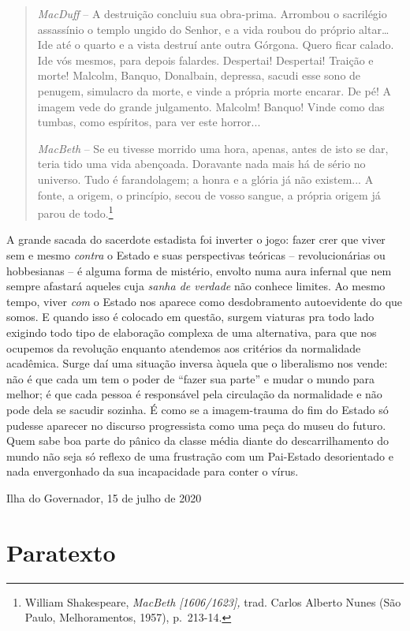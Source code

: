 \begin{quote}
\emph{MacDuff} -- A destruição concluiu sua obra-prima. Arrombou o
sacrilégio assassínio o templo ungido do Senhor, e a vida roubou do
próprio altar\ldots{} Ide até o quarto e a vista destruí ante outra
Górgona. Quero ficar calado. Ide vós mesmos, para depois falardes.
Despertai! Despertai! Traição e morte! Malcolm, Banquo, Donalbain,
depressa, sacudi esse sono de penugem, simulacro da morte, e vinde a
própria morte encarar. De pé! A imagem vede do grande julgamento.
Malcolm! Banquo! Vinde como das tumbas, como espíritos, para ver este
horror...~

\emph{MacBeth} -- Se eu tivesse morrido uma hora, apenas, antes de isto
se dar, teria tido uma vida abençoada. Doravante nada mais há de sério
no universo. Tudo é farandolagem; a honra e a glória já não existem... A
fonte, a origem, o princípio, secou de vosso sangue, a própria origem já
parou de todo.\footnote{William Shakespeare, \emph{MacBeth
  {[}1606/1623{]},} trad. Carlos Alberto Nunes (São Paulo,
  Melhoramentos, 1957), p.~213-14.}
\end{quote}

A grande sacada do sacerdote estadista foi inverter o jogo: fazer crer
que viver sem e mesmo \emph{contra} o Estado e suas perspectivas
teóricas -- revolucionárias ou hobbesianas -- é alguma forma de
mistério, envolto numa aura infernal que nem sempre afastará aqueles
cuja \emph{sanha de verdade} não conhece limites. Ao mesmo tempo, viver
\emph{com} o Estado nos aparece como desdobramento autoevidente do que
somos. E quando isso é colocado em questão, surgem viaturas pra todo
lado exigindo todo tipo de elaboração complexa de uma alternativa, para
que nos ocupemos da revolução enquanto atendemos aos critérios da
normalidade acadêmica. Surge daí uma situação inversa àquela que o
liberalismo nos vende: não é que cada um tem o poder de ``fazer sua
parte'' e mudar o mundo para melhor; é que cada pessoa é responsável
pela circulação da normalidade e não pode dela se sacudir sozinha. É
como se a imagem-trauma do fim do Estado só pudesse aparecer no discurso
progressista como uma peça do museu do futuro. Quem sabe boa parte do
pânico da classe média diante do descarrilhamento do mundo não seja só
reflexo de uma frustração com um Pai-Estado desorientado e nada
envergonhado da sua incapacidade para conter o vírus.

Ilha do Governador, 15 de julho de 2020


\part{Paratexto}\label{paratexto}

